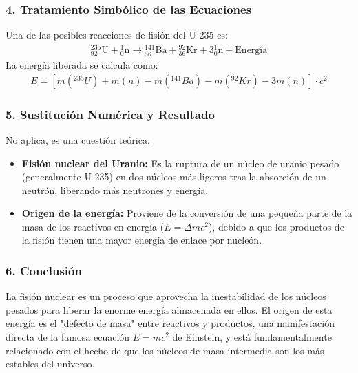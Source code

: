 \subsubsection*{4. Tratamiento Simbólico de las Ecuaciones}
Una de las posibles reacciones de fisión del U-235 es:
\begin{gather}
    {}_{92}^{235}\text{U} + {}_{0}^{1}\text{n} \longrightarrow {}_{56}^{141}\text{Ba} + {}_{36}^{92}\text{Kr} + 3{}_{0}^{1}\text{n} + \text{Energía}
\end{gather}
La energía liberada se calcula como:
\begin{gather}
    E = [m(^{235}U) + m(n) - m(^{141}Ba) - m(^{92}Kr) - 3m(n)] \cdot c^2
\end{gather}

\subsubsection*{5. Sustitución Numérica y Resultado}
No aplica, es una cuestión teórica.
\begin{cajaresultado}
\begin{itemize}
    \item \textbf{Fisión nuclear del Uranio:} Es la ruptura de un núcleo de uranio pesado (generalmente U-235) en dos núcleos más ligeros tras la absorción de un neutrón, liberando más neutrones y energía.
    \item \textbf{Origen de la energía:} Proviene de la conversión de una pequeña parte de la masa de los reactivos en energía ($E=\Delta m c^2$), debido a que los productos de la fisión tienen una mayor energía de enlace por nucleón.
\end{itemize}
\end{cajaresultado}

\subsubsection*{6. Conclusión}
\begin{cajaconclusion}
La fisión nuclear es un proceso que aprovecha la inestabilidad de los núcleos pesados para liberar la enorme energía almacenada en ellos. El origen de esta energía es el "defecto de masa" entre reactivos y productos, una manifestación directa de la famosa ecuación $E=mc^2$ de Einstein, y está fundamentalmente relacionado con el hecho de que los núcleos de masa intermedia son los más estables del universo.
\end{cajaconclusion}

\newpage